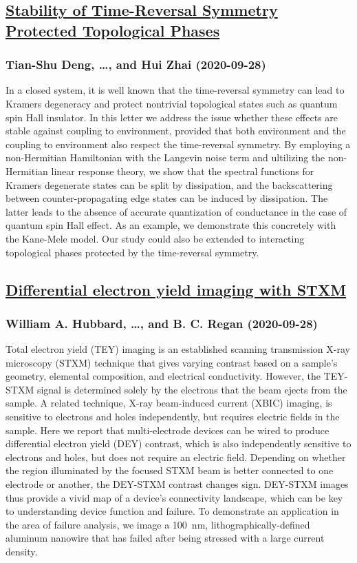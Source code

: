 \subsection*{\href{http://arxiv.org/abs/2009.13043v1}{Stability of Time-Reversal Symmetry Protected Topological Phases}}
\subsubsection*{Tian-Shu Deng, \dots, and Hui Zhai (2020-09-28)}
In a closed system, it is well known that the time-reversal symmetry can lead
to Kramers degeneracy and protect nontrivial topological states such as quantum
spin Hall insulator. In this letter we address the issue whether these effects
are stable against coupling to environment, provided that both environment and
the coupling to environment also respect the time-reversal symmetry. By
employing a non-Hermitian Hamiltonian with the Langevin noise term and
ultilizing the non-Hermitian linear response theory, we show that the spectral
functions for Kramers degenerate states can be split by dissipation, and the
backscattering between counter-propagating edge states can be induced by
dissipation. The latter leads to the absence of accurate quantization of
conductance in the case of quantum spin Hall effect. As an example, we
demonstrate this concretely with the Kane-Mele model. Our study could also be
extended to interacting topological phases protected by the time-reversal
symmetry.

\subsection*{\href{http://arxiv.org/abs/2009.13042v1}{Differential electron yield imaging with STXM}}
\subsubsection*{William A. Hubbard, \dots, and B. C. Regan (2020-09-28)}
Total electron yield (TEY) imaging is an established scanning transmission
X-ray microscopy (STXM) technique that gives varying contrast based on a
sample's geometry, elemental composition, and electrical conductivity. However,
the TEY-STXM signal is determined solely by the electrons that the beam ejects
from the sample. A related technique, X-ray beam-induced current (XBIC)
imaging, is sensitive to electrons and holes independently, but requires
electric fields in the sample. Here we report that multi-electrode devices can
be wired to produce differential electron yield (DEY) contrast, which is also
independently sensitive to electrons and holes, but does not require an
electric field. Depending on whether the region illuminated by the focused STXM
beam is better connected to one electrode or another, the DEY-STXM contrast
changes sign. DEY-STXM images thus provide a vivid map of a device's
connectivity landscape, which can be key to understanding device function and
failure. To demonstrate an application in the area of failure analysis, we
image a 100~nm, lithographically-defined aluminum nanowire that has failed
after being stressed with a large current density.

